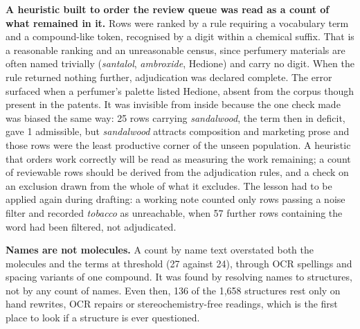 \documentclass[
  computerscience
]{genesisl1-paper}
\begin{document}
\textbf{A heuristic built to order the review queue was read as a count of what remained
in it.}\label{sec:heuristic} Rows were ranked by a rule requiring a vocabulary term and
a compound-like token, recognised by a digit within a chemical suffix. That is a
reasonable ranking and an unreasonable census, since perfumery materials are often named
trivially (\emph{santalol}, \emph{ambroxide}, Hedione) and carry no digit. When the rule
returned nothing further, adjudication was declared complete. The error surfaced when a
perfumer's palette listed Hedione, absent from the corpus though present in the patents.
It was invisible from inside because the one check made was biased the same way: 25 rows
carrying \emph{sandalwood}, the term then in deficit, gave 1 admissible, but
\emph{sandalwood} attracts composition and marketing prose and those rows were the least
productive corner of the unseen population. A heuristic that orders work correctly will
be read as measuring the work remaining; a count of reviewable rows should be derived from
the adjudication rules, and a check on an exclusion drawn from the whole of what it
excludes. The lesson had to be applied again during drafting: a working note counted only
rows passing a noise filter and recorded \emph{tobacco} as unreachable, when 57 further
rows containing the word had been filtered, not adjudicated.

\textbf{Names are not molecules.} A count by name text overstated both the molecules and
the terms at threshold (27 against 24), through OCR spellings and spacing variants of
one compound. It was found by resolving names to structures, not
by any count of names. Even then, 136 of the 1{,}658 structures rest only on hand
rewrites, OCR repairs or stereochemistry-free readings, which is the first place to look
if a structure is ever questioned.
\end{document}
